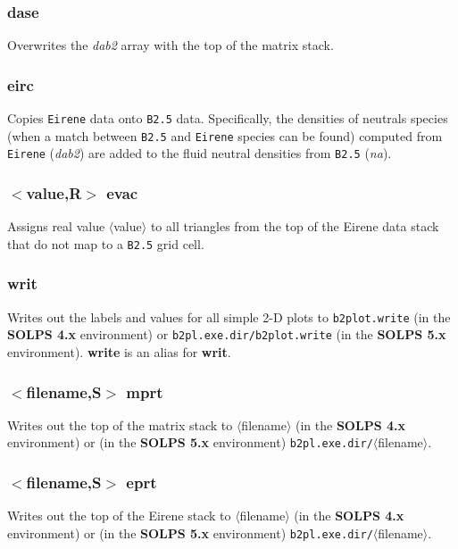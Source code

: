 \documentclass[a4paper,10pt]{report}
\newcommand\SOLPSfour{{\bf SOLPS 4.x} }
\newcommand\SOLPSfive{{\bf SOLPS 5.x} }
\begin{document}
\subsubsection{dase}\label{sec:dase}
Overwrites the {\em dab2} array with the top of the matrix stack.

\subsubsection{eirc}\label{sec:eirc}
Copies {\tt Eirene} data onto {\tt B2.5} data. Specifically, the densities of neutrals
species (when a match between {\tt B2.5} and {\tt Eirene} species can be found)
computed from {\tt Eirene} ({\em dab2}) are added to the fluid neutral densities from
{\tt B2.5} ({\em na}).

\subsubsection{$<$value,{\bf R}$>$ evac}\label{sec:evac}
Assigns real value $\langle$value$\rangle$ to all triangles from the top of the Eirene data stack that do not map to a {\tt B2.5} grid cell.

\subsubsection{writ}\label{sec:writ}
Writes out the labels and values for all simple 2-D plots to \verb:b2plot.write: (in the \SOLPSfour environment)
or \verb:b2pl.exe.dir/b2plot.write: (in the \SOLPSfive environment).
{\bf write} is an alias for {\bf writ}.

\subsubsection{$<$filename,{\bf S}$>$ mprt}\label{sec:mprt}
Writes out the top of the matrix stack to $\langle$filename$\rangle$ (in the \SOLPSfour environment)
or (in the \SOLPSfive environment) \verb:b2pl.exe.dir/:$\langle$filename$\rangle$.

\subsubsection{$<$filename,{\bf S}$>$ eprt}\label{sec:eprt}
Writes out the top of the Eirene stack to $\langle$filename$\rangle$ (in the \SOLPSfour environment)
or (in the \SOLPSfive environment) \verb:b2pl.exe.dir/:$\langle$filename$\rangle$.
\end{document}
